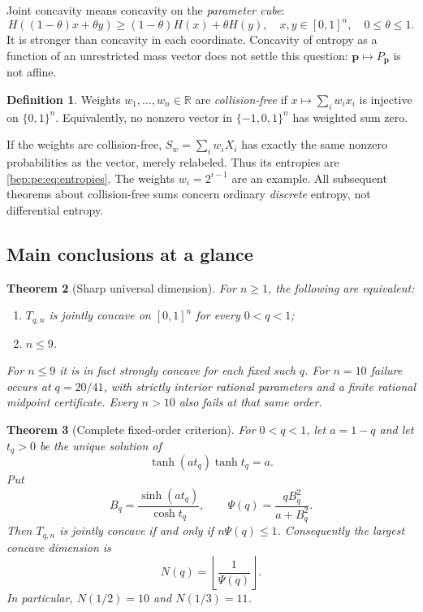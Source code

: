 \documentclass[11pt]{article}
\numberwithin{equation}{section}
\newtheorem{theorem}{Theorem}[section]
\theoremstyle{definition}
\newtheorem{definition}[theorem]{Definition}
\theoremstyle{remark}
\newcommand{\R}{\mathbb R}
\newcommand{\p}{\boldsymbol p}
\begin{document}
Joint concavity means concavity on the \emph{parameter cube}:
\begin{equation}
 H((1-\theta)x+\theta y)\geq(1-\theta)H(x)+\theta H(y),
 \quad x,y\in[0,1]^n,\quad0\leq\theta\leq1.\label{bep:pe:eq:jensen}
\end{equation}
It is stronger than concavity in each coordinate. Concavity of entropy as
a function of an unrestricted mass vector does not settle this question:
$\p\mapsto P_{\p}$ is not affine.

\begin{definition}
Weights $w_1,\ldots,w_n\in\R$ are \emph{collision-free} if
$x\mapsto\sum_iw_ix_i$ is injective on $\{0,1\}^n$.
Equivalently, no nonzero vector in $\{-1,0,1\}^n$ has weighted sum zero.
\end{definition}
If the weights are collision-free, $S_w=\sum_iw_iX_i$ has exactly the same
nonzero probabilities as the vector, merely relabeled. Thus its entropies
are \eqref{bep:pe:eq:entropies}. The weights $w_i=2^{i-1}$ are an example.
All subsequent theorems about collision-free sums concern ordinary
\emph{discrete} entropy, not differential entropy.

\subsection{Main conclusions at a glance}
\begin{theorem}[Sharp universal dimension]\label{bep:pe:thm:nine}
For $n\geq1$, the following are equivalent:
\begin{enumerate}[label=(\roman*)]
\item $T_{q,n}$ is jointly concave on $[0,1]^n$ for every $0<q<1$;
\item $n\leq9$.
\end{enumerate}
For $n\leq9$ it is in fact strongly concave for each fixed such $q$.
For $n=10$ failure occurs at $q=20/41$, with strictly interior rational
parameters and a finite rational midpoint certificate. Every $n>10$
also fails at that same order.
\end{theorem}

\begin{theorem}[Complete fixed-order criterion]\label{bep:pe:thm:profile-summary}
For $0<q<1$, let $a=1-q$ and let $t_q>0$ be the unique solution of
\begin{equation}
 \tanh(a t_q)\tanh t_q=a.\label{bep:pe:eq:critical-summary}
\end{equation}
Put
\begin{equation}
 B_q=\frac{\sinh(a t_q)}{\cosh t_q},\qquad
 \Psi(q)=\frac{qB_q^2}{a+B_q^2}.
\end{equation}
Then $T_{q,n}$ is jointly concave if and only if $n\Psi(q)\leq1$.
Consequently the largest concave dimension is
\begin{equation}
 N(q)=\left\lfloor\frac1{\Psi(q)}\right\rfloor.
\end{equation}
In particular, $N(1/2)=10$ and $N(1/3)=11$.
\end{theorem}
\end{document}
